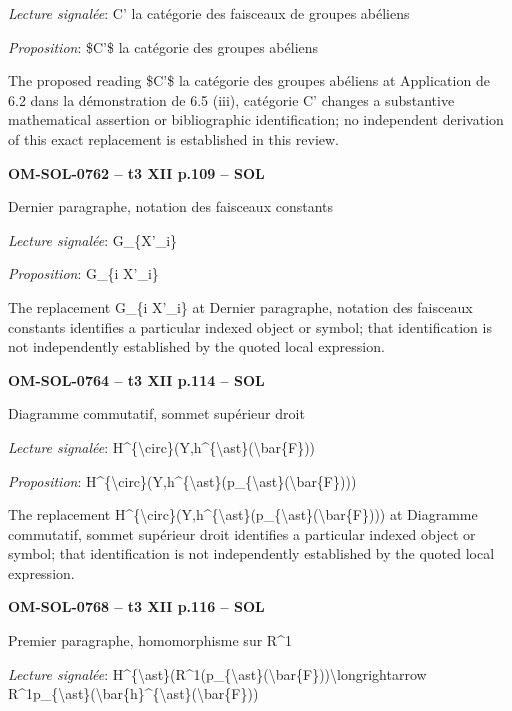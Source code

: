 \emph{Lecture signalée}: C' la catégorie des faisceaux de groupes abéliens\par
\emph{Proposition}: \$C'\$ la catégorie des groupes abéliens\par
The proposed reading \$C'\$ la catégorie des groupes abéliens at Application de 6.2 dans la démonstration de 6.5 (iii), catégorie C' changes a substantive mathematical assertion or bibliographic identification; no independent derivation of this exact replacement is established in this review.\par
\par\noindent\textbf{OM-SOL-0762 -- t3 XII p.109 -- SOL}\par
Dernier paragraphe, notation des faisceaux constants\par
\emph{Lecture signalée}: G\_\{X'\_i\}\par
\emph{Proposition}: G\_\{i X'\_i\}\par
The replacement G\_\{i X'\_i\} at Dernier paragraphe, notation des faisceaux constants identifies a particular indexed object or symbol; that identification is not independently established by the quoted local expression.\par
\par\noindent\textbf{OM-SOL-0764 -- t3 XII p.114 -- SOL}\par
Diagramme commutatif, sommet supérieur droit\par
\emph{Lecture signalée}: H\textasciicircum{}\{\textbackslash{}circ\}(Y,h\textasciicircum{}\{\textbackslash{}ast\}(\textbackslash{}bar\{F\}))\par
\emph{Proposition}: H\textasciicircum{}\{\textbackslash{}circ\}(Y,h\textasciicircum{}\{\textbackslash{}ast\}(p\_\{\textbackslash{}ast\}(\textbackslash{}bar\{F\})))\par
The replacement H\textasciicircum{}\{\textbackslash{}circ\}(Y,h\textasciicircum{}\{\textbackslash{}ast\}(p\_\{\textbackslash{}ast\}(\textbackslash{}bar\{F\}))) at Diagramme commutatif, sommet supérieur droit identifies a particular indexed object or symbol; that identification is not independently established by the quoted local expression.\par
\par\noindent\textbf{OM-SOL-0768 -- t3 XII p.116 -- SOL}\par
Premier paragraphe, homomorphisme sur R\textasciicircum{}1\par
\emph{Lecture signalée}: H\textasciicircum{}\{\textbackslash{}ast\}(R\textasciicircum{}1(p\_\{\textbackslash{}ast\}(\textbackslash{}bar\{F\}))\textbackslash{}longrightarrow R\textasciicircum{}1p\_\{\textbackslash{}ast\}(\textbackslash{}bar\{h\}\textasciicircum{}\{\textbackslash{}ast\}(\textbackslash{}bar\{F\}))\par
